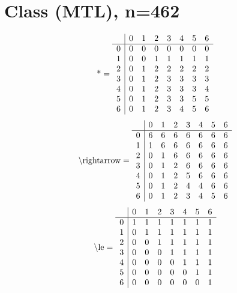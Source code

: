 \documentclass[11pt]{article}
\begin{document}
\section{Class (MTL), n=462}
\[\text{*} = 
\begin{array}{r | r r r r r r r}
 & 0 & 1 & 2 & 3 & 4 & 5 & 6 \\ \hline
0 & 0 & 0 & 0 & 0 & 0 & 0 & 0 \\
1 & 0 & 0 & 1 & 1 & 1 & 1 & 1 \\
2 & 0 & 1 & 2 & 2 & 2 & 2 & 2 \\
3 & 0 & 1 & 2 & 3 & 3 & 3 & 3 \\
4 & 0 & 1 & 2 & 3 & 3 & 3 & 4 \\
5 & 0 & 1 & 2 & 3 & 3 & 5 & 5 \\
6 & 0 & 1 & 2 & 3 & 4 & 5 & 6 \\
\end{array}
\]
\[\text{\textbackslash rightarrow} = 
\begin{array}{r | r r r r r r r}
 & 0 & 1 & 2 & 3 & 4 & 5 & 6 \\ \hline
0 & 6 & 6 & 6 & 6 & 6 & 6 & 6 \\
1 & 1 & 6 & 6 & 6 & 6 & 6 & 6 \\
2 & 0 & 1 & 6 & 6 & 6 & 6 & 6 \\
3 & 0 & 1 & 2 & 6 & 6 & 6 & 6 \\
4 & 0 & 1 & 2 & 5 & 6 & 6 & 6 \\
5 & 0 & 1 & 2 & 4 & 4 & 6 & 6 \\
6 & 0 & 1 & 2 & 3 & 4 & 5 & 6 \\
\end{array}
\]
\[\text{\textbackslash le} = 
\begin{array}{r | r r r r r r r}
 & 0 & 1 & 2 & 3 & 4 & 5 & 6 \\ \hline
0 & 1 & 1 & 1 & 1 & 1 & 1 & 1 \\
1 & 0 & 1 & 1 & 1 & 1 & 1 & 1 \\
2 & 0 & 0 & 1 & 1 & 1 & 1 & 1 \\
3 & 0 & 0 & 0 & 1 & 1 & 1 & 1 \\
4 & 0 & 0 & 0 & 0 & 1 & 1 & 1 \\
5 & 0 & 0 & 0 & 0 & 0 & 1 & 1 \\
6 & 0 & 0 & 0 & 0 & 0 & 0 & 1 \\
\end{array}
\]
\end{document}
